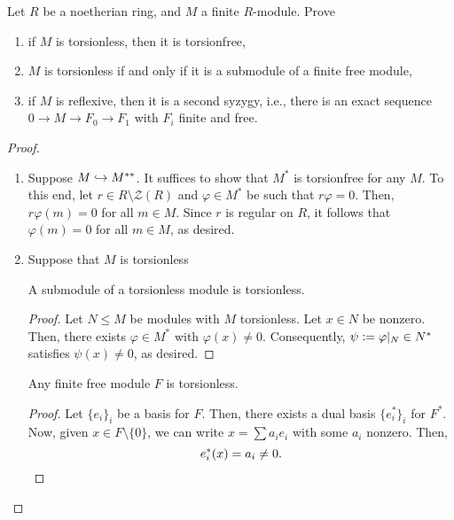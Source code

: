 \documentclass[12pt]{article}
\begin{document}
\begin{exe} \label{exe:noetherian-torsion-reflexive-implications}
	Let $R$ be a noetherian ring, and $M$ a finite $R$-module. Prove
	\begin{enumerate}[label=(\alph*)]
		\item if $M$ is torsionless, then it is torsionfree,
		\item $M$ is torsionless if and only if it is a submodule of a finite free module,
		\item if $M$ is reflexive, then it is a second syzygy, i.e., there is an exact sequence $0 \to M \to F_{0} \to F_{1}$ with $F_{i}$ finite and free.
	\end{enumerate}
\end{exe}
\begin{proof} 
	\phantom{h}
	\begin{enumerate}[label=(\alph*)]
		\item Suppose $M \hookrightarrow M^{\ast \ast}$. It suffices to show that $M^{\ast}$ is torsionfree for any $M$. \newline
		To this end, let $r \in R \setminus \mathcal{Z}(R)$ and $\varphi \in M^{\ast}$ be such that $r \varphi = 0$. Then, $r \varphi(m) = 0$ for all $m \in M$. Since $r$ is regular on $R$, it follows that $\varphi(m) = 0$ for all $m \in M$, as desired.
		\item \forward Suppose that $M$ is torsionless

		\backward {} A submodule of a torsionless module is torsionless.
		\begin{proof} 
			Let $N \le M$ be modules with $M$ torsionless. Let $x \in N$ be nonzero. Then, there exists $\varphi \in M^{\ast}$ with $\varphi(x) \neq 0$. Consequently, $\psi \vcentcolon= \varphi|_{N} \in N^{\ast}$ satisfies $\psi(x) \neq 0$, as desired.
		\end{proof}

		 Any finite free module $F$ is torsionless.
		\begin{proof} 
			Let $\{e_{i}\}_{i}$ be a basis for $F$. Then, there exists a dual basis $\{e_{i}^{\ast}\}_{i}$ for $F^{\ast}$. Now, given $x \in F \setminus \{0\}$, we can write $x = \sum a_{i} e_{i}$ with some $a_{i}$ nonzero. Then,
			\begin{equation*} 
				e_{i}^{\ast}(x) = a_{i} \neq 0. \qedhere
			\end{equation*}
		\end{proof}
	\end{enumerate}
\end{proof}

\newpage

\end{document}
